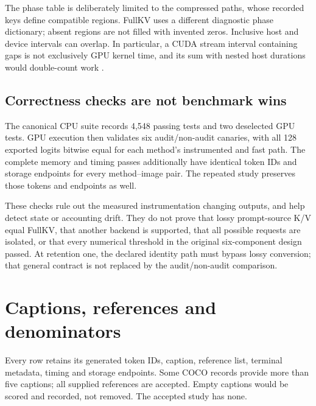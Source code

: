 \documentclass{article}
\begin{document}
\begin{table}[t]
\centering\small\setlength{\tabcolsep}{4pt}

\caption{Mean recorded phase wall times (seconds), over the uninstrumented
256-image pass. Prefill/construct/retire is a combined region, not a
compression-only measurement. The full request contains additional
operations and is not defined by summing these columns. Replay eligibility
is actual engagement under the shared predicate.}
\label{tab:phases}
\end{table}
The phase table is deliberately limited to the compressed paths, whose
recorded keys define compatible regions. FullKV uses a different diagnostic
phase dictionary; absent regions are not filled with invented zeros.
Inclusive host and device intervals can overlap. In particular, a CUDA
stream interval containing gaps is not exclusively GPU kernel time, and
its sum with nested host durations would double-count work
\citep{pytorch2025cuda}.

\subsection{Correctness checks are not benchmark wins}
The canonical CPU suite records 4,548 passing tests and two deselected GPU
tests. GPU execution then validates six audit/non-audit canaries, with all
128 exported logits bitwise equal for each method's instrumented and fast
path. The complete memory and timing passes additionally have identical
token IDs and storage endpoints for every method--image pair. The repeated
study preserves those tokens and endpoints as well.

These checks rule out the measured instrumentation changing outputs, and
help detect state or accounting drift. They do not prove that lossy
prompt-source K/V equal FullKV, that another backend is supported, that
all possible requests are isolated, or that every numerical threshold in
the original six-component design passed. At retention one, the declared
identity path must bypass lossy conversion; that general contract is not
replaced by the audit/non-audit comparison.

\section{Captions, references and denominators}
\begin{table}[t]
\centering\small
\caption{Caption parsing over all 256 images per method. A limit-hit caption
remains in the metric denominator and is not an execution failure silently
discarded. The fixed-work decode still computes 128 predictions after an
early EOS; scoring uses the EOS-aware prefix.}
\label{tab:captions}
\end{table}
Every row retains its generated token IDs, caption, reference list, terminal
metadata, timing and storage endpoints. Some COCO records provide more
than five captions; all supplied references are accepted. Empty captions
would be scored and recorded, not removed. The accepted study has none.
\end{document}
